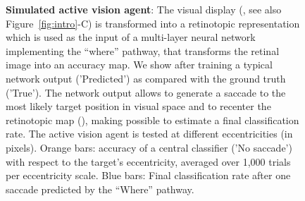 \begin{figure}[t!]%
\caption{
{\bf Simulated active vision agent}:
\A The visual display (\DIS , see also  Figure~\ref{fig:intro}-C)  is transformed into a retinotopic representation which is used as the input of a multi-layer neural network implementing the ``where'' pathway, that transforms the retinal image into an accuracy map. %
\B We show after training a typical network output  ('Predicted') as compared  with the ground truth ('True'). %
\C The network output allows to generate a saccade to the most likely target position in visual space and to recenter the retinotopic map (\SAC ), making possible to estimate a final classification rate. %
\D The active vision agent is tested at different eccentricities (in pixels). Orange bars: accuracy of a central classifier ('No saccade') with respect to the target's eccentricity, averaged over 1,000 trials per eccentricity scale. Blue bars: Final classification rate after one saccade predicted by the ``Where'' pathway.
\label{fig:results}}%
\end{figure}%

